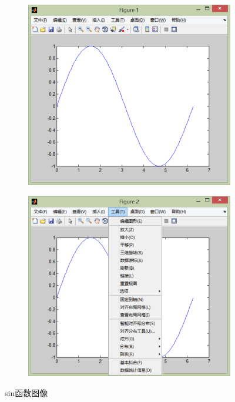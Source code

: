         \begin{figure}[H]
        \centering
        \begin{subfigure}[b]{0.4\textwidth}
            \includegraphics[width=\textwidth]{images/19.jpg}
            \caption{}
            \label{sin函数图像1}
        \end{subfigure}
        \begin{subfigure}[b]{0.4\textwidth}
            \includegraphics[width=\textwidth]{images/20.jpg}
            \caption{}
            \label{sin函数图像2}
        \end{subfigure}
        \caption{sin函数图像}
        \end{figure}
